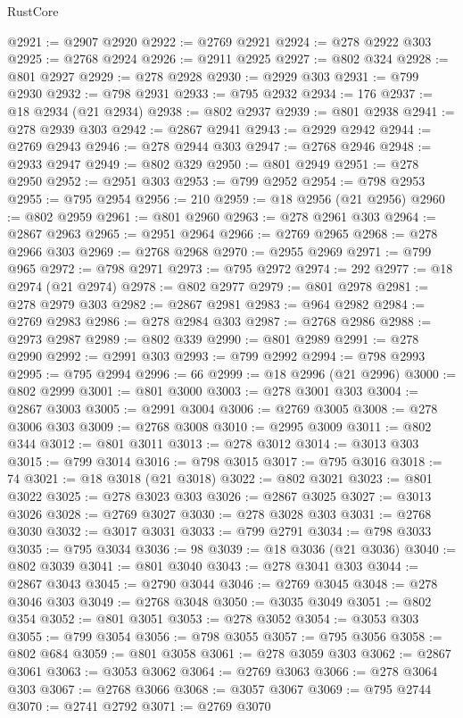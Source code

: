 \begin{lexlean}{RustCore}
\begin{coremodule}
@2921 := @2907 @2920
@2922 := @2769 @2921
@2924 := @278 @2922 @303
@2925 := @2768 @2924
@2926 := @2911 @2925
@2927 := @802 @324
@2928 := @801 @2927
@2929 := @278 @2928
@2930 := @2929 @303
@2931 := @799 @2930
@2932 := @798 @2931
@2933 := @795 @2932
@2934 := 176
@2937 := @18 @2934 (@21 @2934)
@2938 := @802 @2937
@2939 := @801 @2938
@2941 := @278 @2939 @303
@2942 := @2867 @2941
@2943 := @2929 @2942
@2944 := @2769 @2943
@2946 := @278 @2944 @303
@2947 := @2768 @2946
@2948 := @2933 @2947
@2949 := @802 @329
@2950 := @801 @2949
@2951 := @278 @2950
@2952 := @2951 @303
@2953 := @799 @2952
@2954 := @798 @2953
@2955 := @795 @2954
@2956 := 210
@2959 := @18 @2956 (@21 @2956)
@2960 := @802 @2959
@2961 := @801 @2960
@2963 := @278 @2961 @303
@2964 := @2867 @2963
@2965 := @2951 @2964
@2966 := @2769 @2965
@2968 := @278 @2966 @303
@2969 := @2768 @2968
@2970 := @2955 @2969
@2971 := @799 @965
@2972 := @798 @2971
@2973 := @795 @2972
@2974 := 292
@2977 := @18 @2974 (@21 @2974)
@2978 := @802 @2977
@2979 := @801 @2978
@2981 := @278 @2979 @303
@2982 := @2867 @2981
@2983 := @964 @2982
@2984 := @2769 @2983
@2986 := @278 @2984 @303
@2987 := @2768 @2986
@2988 := @2973 @2987
@2989 := @802 @339
@2990 := @801 @2989
@2991 := @278 @2990
@2992 := @2991 @303
@2993 := @799 @2992
@2994 := @798 @2993
@2995 := @795 @2994
@2996 := 66
@2999 := @18 @2996 (@21 @2996)
@3000 := @802 @2999
@3001 := @801 @3000
@3003 := @278 @3001 @303
@3004 := @2867 @3003
@3005 := @2991 @3004
@3006 := @2769 @3005
@3008 := @278 @3006 @303
@3009 := @2768 @3008
@3010 := @2995 @3009
@3011 := @802 @344
@3012 := @801 @3011
@3013 := @278 @3012
@3014 := @3013 @303
@3015 := @799 @3014
@3016 := @798 @3015
@3017 := @795 @3016
@3018 := 74
@3021 := @18 @3018 (@21 @3018)
@3022 := @802 @3021
@3023 := @801 @3022
@3025 := @278 @3023 @303
@3026 := @2867 @3025
@3027 := @3013 @3026
@3028 := @2769 @3027
@3030 := @278 @3028 @303
@3031 := @2768 @3030
@3032 := @3017 @3031
@3033 := @799 @2791
@3034 := @798 @3033
@3035 := @795 @3034
@3036 := 98
@3039 := @18 @3036 (@21 @3036)
@3040 := @802 @3039
@3041 := @801 @3040
@3043 := @278 @3041 @303
@3044 := @2867 @3043
@3045 := @2790 @3044
@3046 := @2769 @3045
@3048 := @278 @3046 @303
@3049 := @2768 @3048
@3050 := @3035 @3049
@3051 := @802 @354
@3052 := @801 @3051
@3053 := @278 @3052
@3054 := @3053 @303
@3055 := @799 @3054
@3056 := @798 @3055
@3057 := @795 @3056
@3058 := @802 @684
@3059 := @801 @3058
@3061 := @278 @3059 @303
@3062 := @2867 @3061
@3063 := @3053 @3062
@3064 := @2769 @3063
@3066 := @278 @3064 @303
@3067 := @2768 @3066
@3068 := @3057 @3067
@3069 := @795 @2744
@3070 := @2741 @2792
@3071 := @2769 @3070

\end{coremodule}
\end{lexlean}
